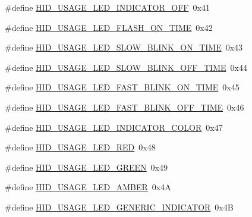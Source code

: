\begin{DoxyCompactItemize}
\#define \hyperlink{group__USBD__HID_ga9b2b1678ab1dc53fea10cb0bf9d5ceb6}{H\-I\-D\-\_\-\-U\-S\-A\-G\-E\-\_\-\-L\-E\-D\-\_\-\-I\-N\-D\-I\-C\-A\-T\-O\-R\-\_\-\-O\-F\-F}~0x41
\item 
\#define \hyperlink{group__USBD__HID_gad942590ef85818bacfbaa0655e0ed269}{H\-I\-D\-\_\-\-U\-S\-A\-G\-E\-\_\-\-L\-E\-D\-\_\-\-F\-L\-A\-S\-H\-\_\-\-O\-N\-\_\-\-T\-I\-M\-E}~0x42
\item 
\#define \hyperlink{group__USBD__HID_gad36a76b56e9907632d47d5c41fb9532a}{H\-I\-D\-\_\-\-U\-S\-A\-G\-E\-\_\-\-L\-E\-D\-\_\-\-S\-L\-O\-W\-\_\-\-B\-L\-I\-N\-K\-\_\-\-O\-N\-\_\-\-T\-I\-M\-E}~0x43
\item 
\#define \hyperlink{group__USBD__HID_ga3a9ec4aee050a3345dab774f559f06b6}{H\-I\-D\-\_\-\-U\-S\-A\-G\-E\-\_\-\-L\-E\-D\-\_\-\-S\-L\-O\-W\-\_\-\-B\-L\-I\-N\-K\-\_\-\-O\-F\-F\-\_\-\-T\-I\-M\-E}~0x44
\item 
\#define \hyperlink{group__USBD__HID_ga29edc17f7621d8e8ae6784719a8fc0d3}{H\-I\-D\-\_\-\-U\-S\-A\-G\-E\-\_\-\-L\-E\-D\-\_\-\-F\-A\-S\-T\-\_\-\-B\-L\-I\-N\-K\-\_\-\-O\-N\-\_\-\-T\-I\-M\-E}~0x45
\item 
\#define \hyperlink{group__USBD__HID_gabe40d382c5e3c869915e538ccfc41852}{H\-I\-D\-\_\-\-U\-S\-A\-G\-E\-\_\-\-L\-E\-D\-\_\-\-F\-A\-S\-T\-\_\-\-B\-L\-I\-N\-K\-\_\-\-O\-F\-F\-\_\-\-T\-I\-M\-E}~0x46
\item 
\#define \hyperlink{group__USBD__HID_gadb3da176f60220a7a4e144951a9d3f04}{H\-I\-D\-\_\-\-U\-S\-A\-G\-E\-\_\-\-L\-E\-D\-\_\-\-I\-N\-D\-I\-C\-A\-T\-O\-R\-\_\-\-C\-O\-L\-O\-R}~0x47
\item 
\#define \hyperlink{group__USBD__HID_ga780c86a3c9ba4067b65eb433ac1f8969}{H\-I\-D\-\_\-\-U\-S\-A\-G\-E\-\_\-\-L\-E\-D\-\_\-\-R\-E\-D}~0x48
\item 
\#define \hyperlink{group__USBD__HID_gaf8c1b2eabce7c6de2d1ac4a42e0ff14e}{H\-I\-D\-\_\-\-U\-S\-A\-G\-E\-\_\-\-L\-E\-D\-\_\-\-G\-R\-E\-E\-N}~0x49
\item 
\#define \hyperlink{group__USBD__HID_gafaf2aa31520e8770dccaa59823f8f991}{H\-I\-D\-\_\-\-U\-S\-A\-G\-E\-\_\-\-L\-E\-D\-\_\-\-A\-M\-B\-E\-R}~0x4\-A
\item 
\#define \hyperlink{group__USBD__HID_ga143b6421daaa592826a0e79f01d807a5}{H\-I\-D\-\_\-\-U\-S\-A\-G\-E\-\_\-\-L\-E\-D\-\_\-\-G\-E\-N\-E\-R\-I\-C\-\_\-\-I\-N\-D\-I\-C\-A\-T\-O\-R}~0x4\-B
\end{DoxyCompactItemize}
